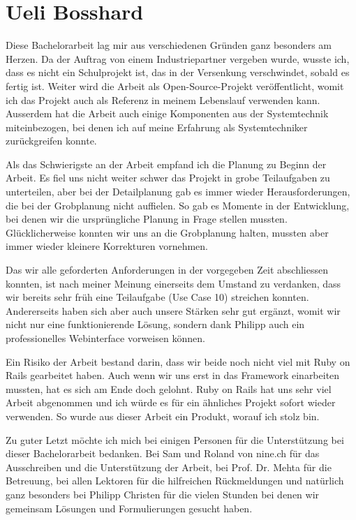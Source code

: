 \section*{Ueli Bosshard}

Diese Bachelorarbeit lag mir aus verschiedenen Gründen ganz besonders am Herzen. Da der Auftrag von einem Industriepartner vergeben wurde, wusste ich, dass es nicht ein Schulprojekt ist, das in der Versenkung verschwindet, sobald es fertig ist. Weiter wird die Arbeit als Open-Source-Projekt veröffentlicht, womit ich das Projekt auch als Referenz in meinem Lebenslauf verwenden kann. Ausserdem hat die Arbeit auch einige Komponenten aus der Systemtechnik miteinbezogen, bei denen ich auf meine Erfahrung als Systemtechniker zurückgreifen konnte.

Als das Schwierigste an der Arbeit empfand ich die Planung zu Beginn der Arbeit. Es fiel uns nicht weiter schwer das Projekt in grobe Teilaufgaben zu unterteilen, aber bei der Detailplanung gab es immer wieder Herausforderungen, die bei der Grobplanung nicht auffielen. So gab es Momente in der Entwicklung, bei denen wir die ursprüngliche Planung in Frage stellen mussten. Glücklicherweise konnten wir uns an die Grobplanung halten, mussten aber immer wieder kleinere Korrekturen vornehmen.

Das wir alle geforderten Anforderungen in der vorgegeben Zeit abschliessen konnten, ist nach meiner Meinung einerseits dem Umstand zu verdanken, dass wir bereits sehr früh eine Teilaufgabe (Use Case 10) streichen konnten. Andererseits haben sich aber auch unsere Stärken sehr gut ergänzt, womit wir nicht nur eine funktionierende Lösung, sondern dank Philipp auch ein professionelles Webinterface vorweisen können.

Ein Risiko der Arbeit bestand darin, dass wir beide noch nicht viel mit Ruby on Rails gearbeitet haben. Auch wenn wir uns erst in das Framework einarbeiten mussten, hat es sich am Ende doch gelohnt. Ruby on Rails hat uns sehr viel Arbeit abgenommen und ich würde es für ein ähnliches Projekt sofort wieder verwenden. So wurde aus dieser Arbeit ein Produkt, worauf ich stolz bin.

Zu guter Letzt möchte ich mich bei einigen Personen für die Unterstützung bei dieser Bachelorarbeit bedanken. Bei Sam und Roland von nine.ch für das Ausschreiben und die Unterstützung der Arbeit, bei Prof. Dr. Mehta für die Betreuung, bei allen Lektoren für die hilfreichen Rückmeldungen und natürlich ganz besonders bei Philipp Christen für die vielen Stunden bei denen wir gemeinsam Lösungen und Formulierungen gesucht haben.